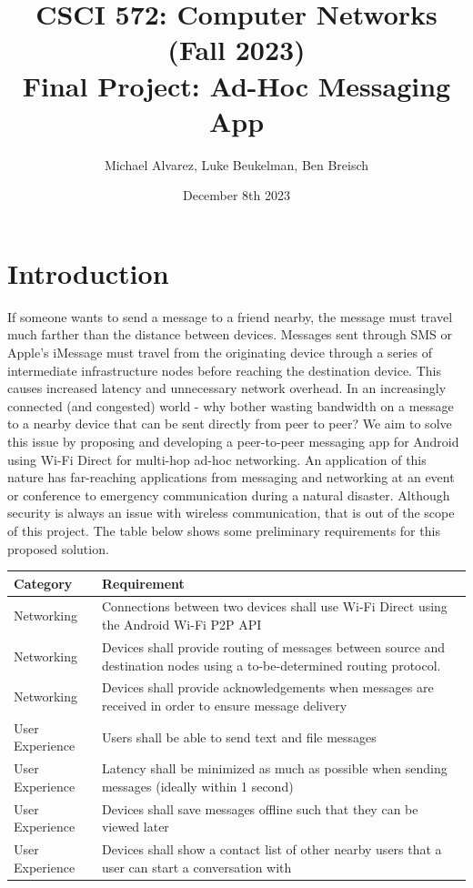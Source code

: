 \documentclass[10pt]{article}
\title{{\normalsize CSCI 572: Computer Networks (Fall 2023)}\\Final Project: Ad-Hoc Messaging App}
\author{Michael Alvarez, Luke Beukelman, Ben Breisch}
\date{December 8th 2023}
\begin{document}
\maketitle

\section{Introduction}
If someone wants to send a message to a friend nearby, the message must travel much farther than the distance between devices. Messages sent through SMS or Apple's iMessage must travel from the originating device through a series of intermediate infrastructure nodes before reaching the destination device. This causes increased latency and unnecessary network overhead. In an increasingly connected (and congested) world - why bother wasting bandwidth on a message to a nearby device that can be sent directly from peer to peer? We aim to solve this issue by proposing and developing a peer-to-peer messaging app for Android using Wi-Fi Direct for multi-hop ad-hoc networking. An application of this nature has far-reaching applications from messaging and networking at an event or conference to emergency communication during a natural disaster. Although security is always an issue with wireless communication, that is out of the scope of this project. The table below shows some preliminary requirements for this proposed solution.
\begin{center}
    \begin{tabular}{| p{} | p{} |}
        \hline
        Category        & Requirement                                                                                                     \\ \hline
        Networking      & Connections between two devices shall use Wi-Fi Direct using the Android Wi-Fi P2P API                          \\ \hline
        Networking      & Devices shall provide routing of messages between source and destination nodes using a to-be-determined routing protocol. \\ \hline
        Networking      & Devices shall provide acknowledgements when messages are received in order to ensure message delivery           \\ \hline
        User Experience & Users shall be able to send text and file messages                                                              \\ \hline
        User Experience & Latency shall be minimized as much as possible when sending messages (ideally within 1 second)                  \\ \hline
        User Experience & Devices shall save messages offline such that they can be viewed later                                          \\ \hline
        User Experience & Devices shall show a contact list of other nearby users that a user can start a conversation with               \\ \hline
    \end{tabular}
\end{center}
\end{document}
